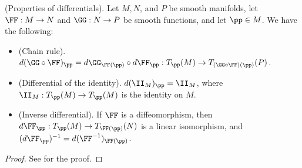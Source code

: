 \begin{theorem}
     (Properties of differentials). Let $M, N$, and $P$ be smooth manifolds, let $\FF:M \rightarrow N$ and $\GG:N \rightarrow P$ be smooth functions, and let $\pp \in M$. We have the following:
    
    \begin{itemize}
        \item (Chain rule). $d(\GG \circ \FF)_\pp = d\GG_{\FF(\pp)} \circ d\FF_\pp:T_\pp(M) \rightarrow T_{(\GG \circ \FF)(\pp)}(P)$.
        \item (Differential of the identity). $d(\II_M)_\pp = \II_M$, where $\II_M:T_\pp(M) \rightarrow T_\pp(M)$ is the identity on $M$.
        \item (Inverse differential). If $\FF$ is a diffeomorphism, then $d\FF_\pp:T_\pp(M) \rightarrow T_{\FF(\pp)}(N)$ is a linear isomorphism, and $(d\FF_\pp)^{-1} = d(\FF^{-1})_{\FF(\pp)}$.
    \end{itemize}
\end{theorem}

\begin{proof}
    See \cite{book::SM} for the proof.
\end{proof}


